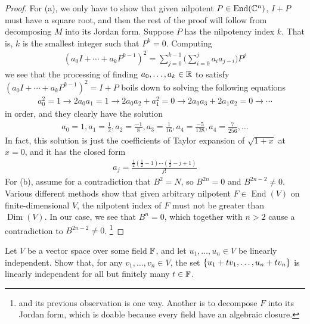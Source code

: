 \documentclass{report}
\begin{document}
\begin{proof}
For (a), we only have to show that given nilpotent $P\in \operatorname{End}(\mathbb{C}^n)$, $I+P$ must have a square root, and then the rest of the proof will follow from decomposing $M$ into its Jordan form. Suppose $P$ has the nilpotency index $k$. That is, $k$ is the smallest integer such that $P^k=0$. Computing
\begin{align*}
  (a_0I+\cdots + a_k P^{k-1})^2= \sum_{j=0}^{k-1} \Big(\sum_{i=0}^j a_i a_{j-i}\Big)P^j 
\end{align*}
we see that the processing of finding $a_0,\dots ,a_k \in\mathbb{R}$ to satisfy $(a_0I+\cdots +a_kP^{k-1})^2=I+P$ boils down to solving the following equations  
\begin{align*}
a_0^2=1 \longrightarrow 2a_0a_1=1 \longrightarrow 2a_0a_2+a_1^2=0\longrightarrow 2a_0a_3+2a_1a_2=0 \longrightarrow \cdots 
\end{align*}
in order, and they clearly have the solution 
\begin{align*}
a_0=1,a_1= \frac{1}{2},a_2 = \frac{-1}{8}, a_3= \frac{1}{16} ,a_4= \frac{-5}{128}, a_4 = \frac{7}{256},\dots 
\end{align*}
In fact, this solution is just the coefficients of Taylor expansion of $\sqrt{1+x}$ at $x=0$, and it has the closed form 
 \begin{align*}
a_j= \frac{\frac{1}{2}(\frac{1}{2}-1)\cdots (\frac{1}{2}-j+1)}{j!}
\end{align*}
For (b), assume for a contradiction that $B^2=N$, so  $B^{2n}=0$ and $B^{2n-2}\neq 0$. Various different methods show that given arbitrary nilpotent $F \in \operatorname{End}(V)$ on finite-dimensional $V$, the nilpotent index of $F$ must not be greater than  $\operatorname{Dim}(V)$. In our case, we see that $B^n=0$, which together with $n>2$ cause a contradiction to  $B^{2n-2}\neq 0$.  \footnote{ and its previous observation is one way. Another is to decompose $F$ into its Jordan form, which is doable because every field have an algebraic closure.} 
\end{proof}
\begin{question}{}{}
Let $V$ be a vector space over some field  $\mathbb{F}$, and let  $u_1,\dots ,u_n \in V$ be linearly independent. Show that, for any $v_1,\dots ,v_n \in V$, the set $\left\{ u_1+t v_1, \dots ,u_n+ t v_n \right\}$ is linearly independent for all but finitely many $t \in \mathbb{F}$.  
\end{question}
\end{document}

